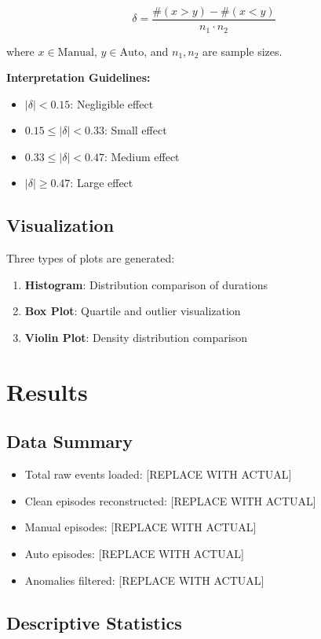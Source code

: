 \documentclass[12pt,a4paper]{article}
\begin{document}
\begin{equation}
    \delta = \frac{\#(x > y) - \#(x < y)}{n_1 \cdot n_2}
\end{equation}

where $x \in \text{Manual}$, $y \in \text{Auto}$, and $n_1, n_2$ are sample sizes.

\textbf{Interpretation Guidelines:}
\begin{itemize}
    \item $|\delta| < 0.15$: Negligible effect
    \item $0.15 \leq |\delta| < 0.33$: Small effect
    \item $0.33 \leq |\delta| < 0.47$: Medium effect
    \item $|\delta| \geq 0.47$: Large effect
\end{itemize}

\subsection{Visualization}
Three types of plots are generated:
\begin{enumerate}
    \item \textbf{Histogram}: Distribution comparison of durations
    \item \textbf{Box Plot}: Quartile and outlier visualization
    \item \textbf{Violin Plot}: Density distribution comparison
\end{enumerate}

\section{Results}

\subsection{Data Summary}
\begin{itemize}
    \item Total raw events loaded: [REPLACE WITH ACTUAL]
    \item Clean episodes reconstructed: [REPLACE WITH ACTUAL]
    \item Manual episodes: [REPLACE WITH ACTUAL]
    \item Auto episodes: [REPLACE WITH ACTUAL]
    \item Anomalies filtered: [REPLACE WITH ACTUAL]
\end{itemize}

\subsection{Descriptive Statistics}
\end{document}
